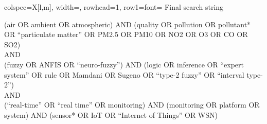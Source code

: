 \begin{longtblr}
[
 label={tab:cadena_final},
 caption={Final search string used in the selected databases. Own elaboration.}]{
  colspec={X[l,m]},
  width=\textwidth,
  rowhead=1,
  row{1}={font=\bfseries}
}
\toprule
Final search string \\
\midrule

\small
(air OR ambient OR atmospheric) AND (quality OR pollution OR pollutant* OR ``particulate matter'' OR PM2.5 OR PM10 OR NO2 OR O3 OR CO OR SO2) \\
AND \\
(fuzzy OR ANFIS OR ``neuro-fuzzy'') AND (logic OR inference OR ``expert system'' OR rule OR Mamdani OR Sugeno OR ``type-2 fuzzy'' OR ``interval type-2'') \\
AND \\
(``real-time'' OR ``real time'' OR monitoring) AND (monitoring OR platform OR system) AND (sensor* OR IoT OR ``Internet of Things'' OR WSN) \\

\bottomrule
\end{longtblr}
